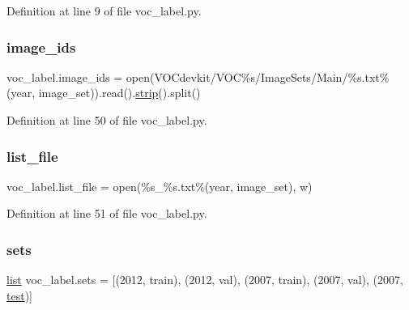 Definition at line 9 of file voc\+\_\+label.\+py.

\mbox{\label{namespacevoc__label_a57a526ed1c226d30a484d56ca3fcda07}} 
\subsubsection{\texorpdfstring{image\_ids}{image\_ids}}
{\footnotesize\ttfamily voc\+\_\+label.\+image\+\_\+ids = open(\textquotesingle{}V\+O\+Cdevkit/V\+OC\%s/Image\+Sets/Main/\%s.\+txt\textquotesingle{}\%(year, image\+\_\+set)).read().\mbox{\hyperlink{darknet__ros_2darknet_2src_2utils_8h_a76299b86e144434260dcab80323ec9da}{strip}}().split()}



Definition at line 50 of file voc\+\_\+label.\+py.

\mbox{\label{namespacevoc__label_a6842cb03274520125ec688c9a076c3a6}} 
\subsubsection{\texorpdfstring{list\_file}{list\_file}}
{\footnotesize\ttfamily voc\+\_\+label.\+list\+\_\+file = open(\textquotesingle{}\%s\+\_\+\%s.\+txt\textquotesingle{}\%(year, image\+\_\+set), \textquotesingle{}w\textquotesingle{})}



Definition at line 51 of file voc\+\_\+label.\+py.

\mbox{\label{namespacevoc__label_a41c13500b772a8e333989ee599cb5e59}} 
\subsubsection{\texorpdfstring{sets}{sets}}
{\footnotesize\ttfamily \mbox{\hyperlink{structlist}{list}} voc\+\_\+label.\+sets = \mbox{[}(\textquotesingle{}2012\textquotesingle{}, \textquotesingle{}train\textquotesingle{}), (\textquotesingle{}2012\textquotesingle{}, \textquotesingle{}val\textquotesingle{}), (\textquotesingle{}2007\textquotesingle{}, \textquotesingle{}train\textquotesingle{}), (\textquotesingle{}2007\textquotesingle{}, \textquotesingle{}val\textquotesingle{}), (\textquotesingle{}2007\textquotesingle{}, \textquotesingle{}\mbox{\hyperlink{classtest}{test}}\textquotesingle{})\mbox{]}}



